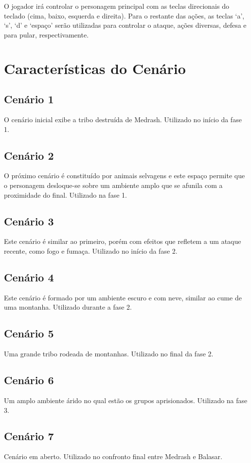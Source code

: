 \documentclass[letterpaper,11pt]{article}
\begin{document}
O jogador irá controlar o personagem principal com as teclas direcionais do teclado (cima, baixo, esquerda e direita). 
Para o restante das ações, as teclas `a', `s', `d' e `espaço' serão utilizadas para controlar o ataque, ações diversas, defesa e para pular, respectivamente.

\section{Características do Cenário}

\subsection{Cenário 1}
 O cenário inicial exibe a tribo destruída de Medrash. Utilizado no início da fase 1.

\subsection{Cenário 2}
 O próximo cenário é constituído por animais selvagens e este espaço permite que o personagem desloque-se sobre um ambiente amplo que se afunila com a proximidade do final. Utilizado na fase 1.

\subsection{Cenário 3}
 Este cenário é similar ao primeiro, porém com efeitos que refletem a um ataque recente, como fogo e fumaça. Utilizado no início da fase 2.

\subsection{Cenário 4}
 Este cenário é formado por um ambiente escuro e com neve, similar ao cume de uma montanha. Utilizado durante a fase 2.

\subsection{Cenário 5}
 Uma grande tribo rodeada de montanhas. Utilizado no final da fase 2.

\subsection{Cenário 6}
 Um amplo ambiente árido no qual estão os grupos aprisionados. Utilizado na fase 3.

\subsection{Cenário 7}
 Cenário em aberto. Utilizado no confronto final entre Medrash e Balasar.
\end{document}
